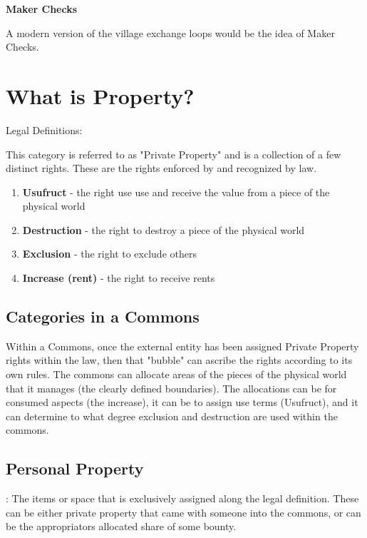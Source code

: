 \documentclass{article}
\begin{document}
\large \textbf{Maker Checks}

A modern version of the village exchange loops would be the idea of Maker Checks. 




\pagebreak
\section{What is Property?}
\large Legal Definitions:

This category is referred to as "Private Property" and is a collection of a few distinct rights. These are the rights enforced by and recognized by law. 

\begin{enumerate}
	
	\item \textbf{Usufruct} - the right use use and receive the value from a piece of the physical world

	\item \textbf{Destruction} - the right to destroy a piece of the physical world

	\item \textbf{Exclusion} -  the right to exclude others
 
	\item \textbf{Increase (rent)} - the right to receive rents
\end{enumerate}
	

\subsection{Categories in a Commons}

Within a Commons, once the external entity has been assigned Private Property rights within the law, then that "bubble" can ascribe the rights according to its own rules. The commons can allocate areas of the pieces of the physical world that it manages (the clearly defined boundaries). The allocations can be for consumed aspects (the increase), it can be to assign use terms (Usufruct), and it can determine to what degree exclusion and destruction are used within the commons.

\subsection{Personal Property}: The items or space that is exclusively assigned along the legal definition. These can be either private property that came with someone into the commons, or can be the appropriators allocated share of some bounty. 
\end{document}
